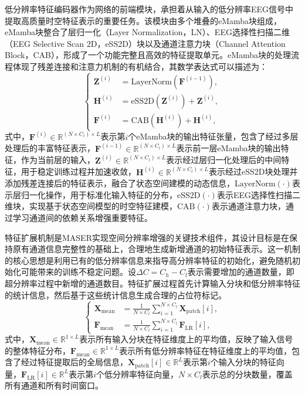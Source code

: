 低分辨率特征编码器作为网络的前端模块，承担着从输入的低分辨率EEG信号中提取高质量时空特征表示的重要任务。该模块由多个堆叠的eMamba块组成，eMamba块整合了层归一化（Layer Normalization，LN）、EEG选择性扫描二维（EEG Selective Scan 2D，eSS2D）块以及通道注意力块（Channel Attention Block，CAB），形成了一个功能完整且高效的特征提取单元。eMamba块的处理流程体现了残差连接和注意力机制的有机结合，其数学表达式可以描述为：
\begin{equation}
\left\{
\begin{aligned}
\mathbf{Z}^{(i)} &= \mathrm{LayerNorm}\!\left(\mathbf{F}^{(i-1)}\right), \\
\mathbf{H}^{(i)} &= \mathrm{eSS2D}\!\left(\mathbf{Z}^{(i)}\right) + \mathbf{Z}^{(i)}, \\
\mathbf{F}^{(i)} &= \mathrm{CAB}\!\left(\mathbf{H}^{(i)}\right) + \mathbf{H}^{(i)},
\end{aligned}
\right.
\label{eq:emamba_block}
\end{equation}
式中，$\mathbf{F}^{(i)} \in \mathbb{R}^{(N \times C_l) \times L}$表示第$i$个eMamba块的输出特征张量，包含了经过多层处理后的丰富特征表示，$\mathbf{F}^{(i-1)} \in \mathbb{R}^{(N \times C_l) \times L}$表示前一层eMamba块的输出特征，作为当前层的输入，$\mathbf{Z}^{(i)} \in \mathbb{R}^{(N \times C_l) \times L}$表示经过层归一化处理后的中间特征，用于稳定训练过程并加速收敛，$\mathbf{H}^{(i)} \in \mathbb{R}^{(N \times C_l) \times L}$表示经过eSS2D块处理并添加残差连接后的特征表示，融合了状态空间建模的动态信息，$\mathrm{LayerNorm}(\cdot)$表示层归一化操作，用于标准化输入特征的分布，$\mathrm{eSS2D}(\cdot)$表示EEG选择性扫描二维块，实现基于状态空间模型的时空特征建模，$\mathrm{CAB}(\cdot)$表示通道注意力块，通过学习通道间的依赖关系增强重要特征。

特征扩展机制是MASER实现空间分辨率增强的关键技术组件，其设计目标是在保持原有通道信息完整性的基础上，合理地生成新增通道的初始特征表示。这一机制的核心思想是利用已有的低分辨率信息来指导高分辨率特征的初始化，避免随机初始化可能带来的训练不稳定问题。设$\Delta C = C_h - C_l$表示需要增加的通道数量，即超分辨率过程中新增的通道数目。特征扩展过程首先计算输入分块和低分辨率特征的统计信息，然后基于这些统计信息生成合理的占位符标记。
\begin{equation}
\left\{
\begin{aligned}
\mathbf{X}_{\text{mean}} &= \frac{1}{N \times C_l} \sum_{i=1}^{N \times C_l} \mathbf{X}_{\text{patch}}[i], \\
\mathbf{F}_{\text{mean}} &= \frac{1}{N \times C_l} \sum_{i=1}^{N \times C_l} \mathbf{F}_{\text{LR}}[i],
\end{aligned}
\right.
\label{eq:mean_computation}
\end{equation}
式中，$\mathbf{X}_{\text{mean}} \in \mathbb{R}^{1 \times L}$表示所有输入分块在特征维度上的平均值，反映了输入信号的整体特征分布，$\mathbf{F}_{\text{mean}} \in \mathbb{R}^{1 \times L}$表示所有低分辨率特征在特征维度上的平均值，包含了经过特征提取后的全局信息，$\mathbf{X}_{\text{patch}}[i] \in \mathbb{R}^{L}$表示第$i$个输入分块的特征向量，$\mathbf{F}_{\text{LR}}[i] \in \mathbb{R}^{L}$表示第$i$个低分辨率特征向量，$N \times C_l$表示总的分块数量，覆盖所有通道和所有时间窗口。

